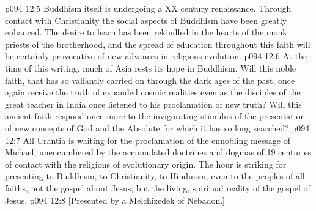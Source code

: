 \vs p094 12:5 Buddhism itself is undergoing a XX century renaissance. Through contact with Christianity the social aspects of Buddhism have been greatly enhanced. The desire to learn has been rekindled in the hearts of the monk priests of the brotherhood, and the spread of education throughout this faith will be certainly provocative of new advances in religious evolution.
\vs p094 12:6 At the time of this writing, much of Asia rests its hope in Buddhism. Will this noble faith, that has so valiantly carried on through the dark ages of the past, once again receive the truth of expanded cosmic realities even as the disciples of the great teacher in India once listened to his proclamation of new truth? Will this ancient faith respond once more to the invigorating stimulus of the presentation of new concepts of God and the Absolute for which it has so long searched?
\vs p094 12:7 \pc All Urantia is waiting for the proclamation of the ennobling message of Michael, unencumbered by the accumulated doctrines and dogmas of 19 centuries of contact with the religions of evolutionary origin. The hour is striking for presenting to Buddhism, to Christianity, to Hinduism, even to the peoples of all faiths, not the gospel about Jesus, but the living, spiritual reality of the gospel of Jesus.
\vsetoff
\vs p094 12:8 [Presented by a Melchizedek of Nebadon.]
\quizlink
